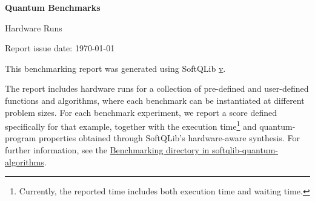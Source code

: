 \documentclass[a4paper]{article}
\begin{document}
\color{ThemeText}

\begin{center}
  {\LARGE\bfseries Quantum Benchmarks\par}
  \vspace{0.3em}
  {\large Hardware Runs\par}
  \vspace{0.4em}
  {\normalsize Report issue date: \today\par}
\end{center}

\vspace{1em}



This benchmarking report was generated using SoftQLib \href{https://platform.softqlib.com/}{v\softqlibversion}.
\medskip

The report includes hardware runs for a collection of pre-defined and user-defined functions and algorithms,
where each benchmark can be instantiated at different problem sizes. For each benchmark experiment,
we report a score defined specifically for that example,
together with the execution time\footnote{Currently, the reported time includes both execution time and waiting time.}
and quantum-program properties obtained through SoftQLib's hardware-aware synthesis.
For further information, see the \href{https://github.com/softqlib/softqlib-quantum-algorithms/tree/main/benchmarking}{Benchmarking directory in softqlib-quantum-algorithms}.

\bigskip

\end{document}
